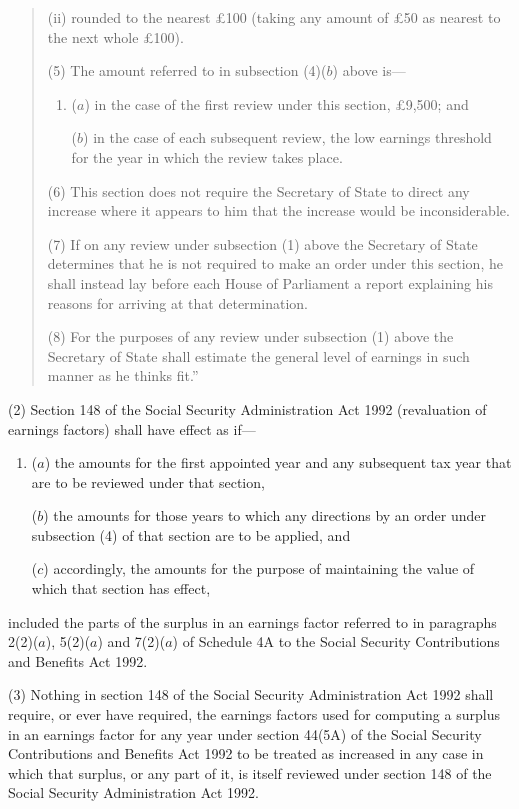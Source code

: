 \documentclass[12pt,a4paper]{article}
\begin{document}
\begin{quotation}
\begin{enumerate}
\begin{enumerate}
(ii) rounded to the nearest £100 (taking any amount of £50 as nearest to the next whole £100).
\end{enumerate}
\end{enumerate}

(5) The amount referred to in subsection (4)($b$)  above is—
\begin{enumerate}\item[]
($a$) in the case of the first review under this section, £9,500; and

($b$) in the case of each subsequent review, the low earnings threshold for the year in which the review takes place.
\end{enumerate}

(6) This section does not require the Secretary of State to direct any increase where it appears to him that the increase would be inconsiderable.

(7) If on any review under subsection (1)  above the Secretary of State determines that he is not required to make an order under this section, he shall instead lay before each House of Parliament a report explaining his reasons for arriving at that determination.

(8) For the purposes of any review under subsection (1)  above the Secretary of State shall estimate the general level of earnings in such manner as he thinks fit.”
\end{quotation}

(2) Section 148 of the Social Security Administration Act 1992 (revaluation of earnings factors) shall have effect as if—
\begin{enumerate}\item[]
($a$) the amounts for the first appointed year and any subsequent tax year that are to be reviewed under that section,

($b$) the amounts for those years to which any directions by an order under subsection (4)  of that section are to be applied, and

($c$) accordingly, the amounts for the purpose of maintaining the value of which that section has effect,
\end{enumerate}
included the parts of the surplus in an earnings factor referred to in paragraphs 2(2)($a$), 5(2)($a$)  and 7(2)($a$)  of Schedule 4A to the Social Security Contributions and Benefits Act 1992. 

(3) Nothing in section 148 of the Social Security Administration Act 1992 shall require, or ever have required, the earnings factors used for computing a surplus in an earnings factor for any year under section 44(5A)  of the Social Security Contributions and Benefits Act 1992 to be treated as increased in any case in which that surplus, or any part of it, is itself reviewed under section 148 of the Social Security Administration Act 1992. 
\end{document}
